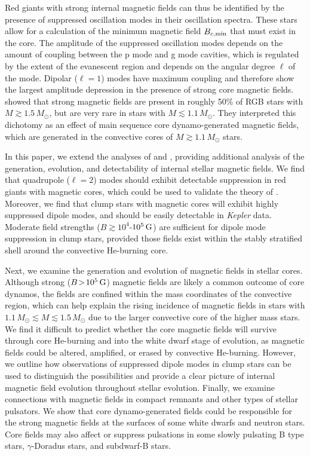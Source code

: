 Red giants with strong internal magnetic fields can thus be identified by the presence of suppressed oscillation modes in their oscillation spectra. These stars allow for a calculation of the minimum magnetic field $B_{c,{\rm min}}$ that must exist in the core. The amplitude of the suppressed oscillation modes depends on the amount of coupling between the p mode and g mode cavities, which is regulated by the extent of the evanescent region and depends on the angular degree $\ell$ of the mode. Dipolar ($\ell=1$) modes have maximum coupling and therefore show the largest amplitude depression in the presence of strong core magnetic fields. \cite{Stello_2016} showed that strong magnetic fields are present in roughly 50\% of RGB stars with $M \gtrsim 1.5 \, M_\odot$, but are very rare in stars with $M \lesssim 1.1 \, M_\odot$. They interpreted this dichotomy as an effect of main sequence core dynamo-generated magnetic fields, which are generated in the convective cores of $M \gtrsim 1.1 \, M_\odot$ stars.

In this paper, we extend the analyses of \cite{Fuller_2015} and \cite{Stello_2016}, providing additional analysis of the generation, evolution, and detectability of internal stellar magnetic fields. We find that quadrupole ($\ell=2$) modes should exhibit detectable suppression in red giants with magnetic cores, which could be used to validate the theory of \cite{Fuller_2015}. Moreover, we find that clump stars with magnetic cores will exhibit highly suppressed dipole modes, and should be easily detectable in {\it Kepler} data. Moderate field strengths ($B \gtrsim 10^4$-$10^5 \, {\rm G}$) are sufficient for dipole mode suppression in clump stars, provided those fields exist within the stably stratified shell around the convective He-burning core.

Next, we examine the generation and evolution of magnetic fields in stellar cores. Although strong ($B \! > \! 10^5 \, {\rm G}$) magnetic fields are likely a common outcome of core dynamos, the fields are confined within the mass coordinates of the convective region, which can help explain the rising incidence of magnetic fields in stars with $1.1 \, M_\odot \! \lesssim \! M \! \lesssim \! 1.5 \, M_\odot$ due to the larger convective core of the higher mass stars. We find it difficult to predict whether the core magnetic fields will survive through core He-burning and into the white dwarf stage of evolution, as magnetic fields could be altered, amplified, or erased by convective He-burning. However, we outline how observations of suppressed dipole modes in clump stars can be used to distinguish the possibilities and provide a clear picture of internal magnetic field evolution throughout stellar evolution. Finally, we examine connections with magnetic fields in compact remnants and other types of stellar pulsators. We show that core dynamo-generated fields could be responsible for the strong magnetic fields at the surfaces of some white dwarfs and neutron stars. Core fields may also affect or suppress pulsations in some slowly pulsating B type stars, $\gamma$-Doradus stars, and subdwarf-B stars. 

